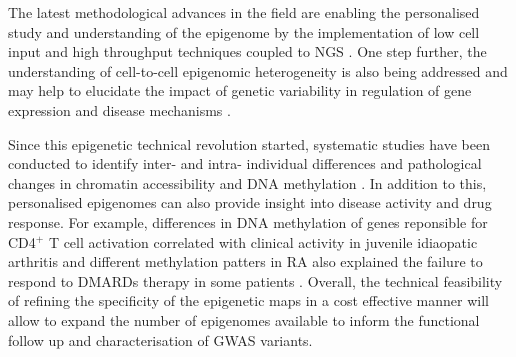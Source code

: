 The latest methodological advances in the field are enabling the personalised study and understanding of the epigenome by the implementation of low cell input and high throughput techniques coupled to NGS \parencite{Buenrostro2013, Schmidl2015,Oudelaar2017}. One step further, the understanding of cell-to-cell epigenomic heterogeneity is also being addressed and may help to elucidate the impact of genetic variability in regulation of gene expression and disease mechanisms \parencite{Buenrostro2015, Cusanovich2015,Rotem2015,Nagano2013,Smallwood2014}.

Since this epigenetic technical revolution started, systematic studies have been conducted to identify inter- and intra- individual differences and pathological changes in chromatin accessibility and DNA methylation \parencite{Qu2015,Corces2016,Liu2013. Add other ATAC}. %
In addition to this, personalised epigenomes can also provide insight into disease activity and drug response. For example, differences in DNA methylation of genes reponsible for CD4$^+$ T cell activation correlated with clinical activity in juvenile idiaopatic arthritis and different methylation patters in RA also explained the failure to respond to DMARDs therapy in some patients \parencite{Spreafico2016,Glossop2017}. Overall, the technical feasibility of refining the specificity of the epigenetic maps in a cost effective manner will allow to expand the number of epigenomes available to inform the functional follow up and characterisation of GWAS variants.



